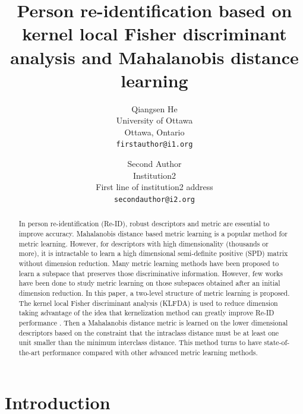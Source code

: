 \documentclass[10pt,twocolumn,letterpaper]{article}
\begin{document}
\title{Person re-identification based on kernel local Fisher discriminant analysis and Mahalanobis distance learning}

\author{Qiangsen He\\
University of Ottawa\\
Ottawa, Ontario\\
{\tt\small firstauthor@i1.org}
\and
Second Author\\
Institution2\\
First line of institution2 address\\
{\tt\small secondauthor@i2.org}
}

\maketitle


\begin{abstract}
   In person re-identification (Re-ID), robust descriptors and metric are essential to improve accuracy. Mahalanobis distance based metric learning is a popular method for metric learning. However, for descriptors with high dimensionality (thousands or more), it is intractable to learn a high dimensional semi-definite positive (SPD) matrix without dimension reduction.  Many metric learning methods have been proposed to learn a subspace that preserves those discriminative information. However, few works have been done to study metric learning on those subspaces obtained after an initial dimension reduction. In this paper, a two-level structure of metric learning is proposed. The kernel local Fisher discriminant analysis (KLFDA) is used to reduce dimension taking advantage of the idea that kernelization method can greatly improve Re-ID performance \cite{KernelVersionMetrics}. Then a Mahalanobis distance metric is learned on the lower dimensional descriptors based on the constraint that the intraclass distance must be at least one unit smaller than the minimum interclass distance. This method turns to have state-of-the-art performance compared with other advanced metric learning methods.
\end{abstract}

\section{Introduction}
\end{document}
